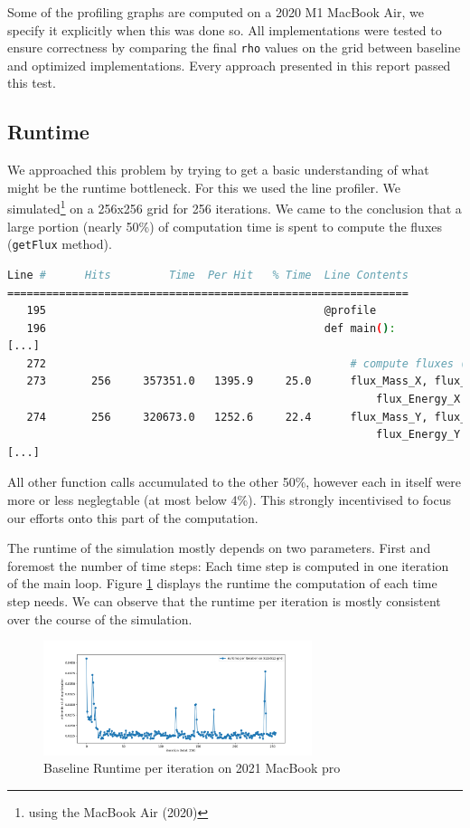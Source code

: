 \documentclass[a4paper,10pt]{article}
\begin{document}
Some of the profiling graphs are computed on a 2020 M1 MacBook Air, we specify it explicitly when this was done so.
All implementations were tested to ensure correctness by comparing the final \verb|rho| values on the grid between baseline and optimized implementations.
Every approach presented in this report passed this test.

\subsection{Runtime}
We approached this problem by trying to get a basic understanding of what might be the runtime bottleneck.
For this we used the line profiler.
We simulated\footnote{using the MacBook Air (2020)} on a 256x256 grid for 256 iterations.
We came to the conclusion that a large portion (nearly 50\%) of computation time is spent to compute the fluxes (\verb|getFlux| method).
\begin{lstlisting}[language=bash,basicstyle=\scriptsize\ttfamily]
Line #      Hits         Time  Per Hit   % Time  Line Contents
==============================================================
   195                                           @profile
   196                                           def main():
[...]
   272                                               # compute fluxes (local Lax-Friedrichs/Rusanov)
   273       256     357351.0   1395.9     25.0      flux_Mass_X, flux_Momx_X, flux_Momy_X,
                                                         flux_Energy_X = getFlux(...)
   274       256     320673.0   1252.6     22.4      flux_Mass_Y, flux_Momy_Y, flux_Momx_Y,
                                                         flux_Energy_Y = getFlux(...)
[...]
\end{lstlisting}
All other function calls accumulated to the other 50\%, however each in itself were more or less neglegtable (at most below 4\%).
This strongly incentivised to focus our efforts onto this part of the computation.

The runtime of the simulation mostly depends on two parameters.
First and foremost the number of time steps:
Each time step is computed in one iteration of the main loop.
Figure \ref{fig:runtime_per_iteration} displays the runtime the computation of each time step needs.
We can observe that the runtime per iteration is mostly consistent over the course of the simulation.
\begin{figure}[ht]
  \centering
  \includegraphics[width=0.7\textwidth]{images/baseline/baseline_per_iteration_macair.png}
  \caption{Baseline Runtime per iteration on 2021 MacBook pro}
  \label{fig:runtime_per_iteration}
\end{figure}
\end{document}
